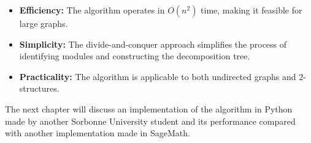 \begin{itemize}
    \item \textbf{Efficiency:} The algorithm operates in $O(n^2)$ time, making it feasible for large graphs.
    \item \textbf{Simplicity:} The divide-and-conquer approach simplifies the process of identifying modules and constructing the decomposition tree.
    \item \textbf{Practicality:} The algorithm is applicable to both undirected graphs and 2-structures.
\end{itemize}


\hspace{4cm}

The next chapter will discuss an implementation of the algorithm in Python made by another Sorbonne University student and its performance compared with another implementation made in SageMath.
